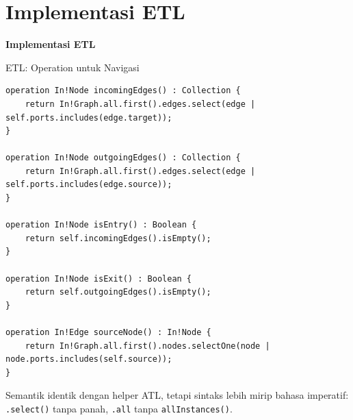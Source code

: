 \documentclass[aspectratio=169, table]{beamer}
\begin{document}
\section{Implementasi ETL}
\begin{frame}{\hfill}
	\centering
	\Huge{\textbf{Implementasi ETL}}
\end{frame}

\begin{frame}[fragile]{ETL: Operation untuk Navigasi}
\vspace{4pt}
\begin{lstlisting}[language=etl, basicstyle=\ttfamily\tiny]
operation In!Node incomingEdges() : Collection {
    return In!Graph.all.first().edges.select(edge | self.ports.includes(edge.target));
}

operation In!Node outgoingEdges() : Collection {
    return In!Graph.all.first().edges.select(edge | self.ports.includes(edge.source));
}

operation In!Node isEntry() : Boolean {
    return self.incomingEdges().isEmpty();
}

operation In!Node isExit() : Boolean {
    return self.outgoingEdges().isEmpty();
}

operation In!Edge sourceNode() : In!Node {
    return In!Graph.all.first().nodes.selectOne(node | node.ports.includes(self.source));
}
\end{lstlisting}

\vspace{4pt}
\small
Semantik identik dengan helper ATL, tetapi sintaks lebih mirip bahasa imperatif: \texttt{.select()} tanpa panah, \texttt{.all} tanpa \texttt{allInstances()}.
\end{frame}
\end{document}
